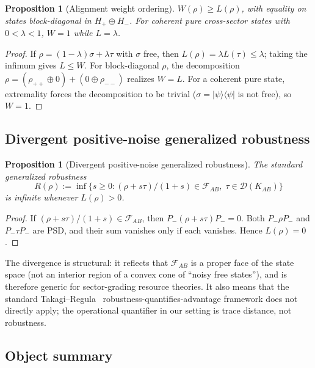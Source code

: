\documentclass[a4paper,onecolumn,noarxiv]{quantumarticle}
\theoremstyle{plain}
\newtheorem{proposition}[theorem]{Proposition}
\theoremstyle{definition}
\theoremstyle{remark}
\newcommand{\KAB}{K_{AB}}
\newcommand{\Pminus}{P_{-}}
\newcommand{\Hplus}{H_{+}}
\newcommand{\Hminus}{H_{-}}
\newcommand{\FAB}{\mathcal{F}_{AB}}
\newcommand{\Lleak}{L}
\begin{document}
\begin{proposition}[Alignment weight ordering]
\label{prop:weight}
$W(\rho)\ge\Lleak(\rho)$, with equality on states block-diagonal in $\Hplus\oplus\Hminus$.
For coherent pure cross-sector states with $0<\lambda<1$, $W=1$ while
$\Lleak=\lambda$.
\end{proposition}

\begin{proof}
If $\rho=(1-\lambda)\sigma+\lambda\tau$ with $\sigma$ free, then
$\Lleak(\rho)=\lambda\Lleak(\tau)\le\lambda$; taking the infimum gives $\Lleak\le W$.
For block-diagonal $\rho$, the decomposition $\rho=(\rho_{++}\oplus 0)+(0\oplus\rho_{--})$
realizes $W=\Lleak$. For a coherent pure state, extremality forces the decomposition
to be trivial ($\sigma=|\psi\rangle\langle\psi|$ is not free), so $W=1$.
\end{proof}

\subsection{Divergent positive-noise generalized robustness}

\begin{proposition}[Divergent positive-noise generalized robustness]
\label{prop:robustness}
The standard generalized robustness
\begin{equation}
  R(\rho) := \inf\{s\ge 0 : (\rho+s\tau)/(1+s)\in\FAB,\;\tau\in\mathcal{D}(\KAB)\}
\end{equation}
is infinite whenever $\Lleak(\rho)>0$.
\end{proposition}

\begin{proof}
If $(\rho+s\tau)/(1+s)\in\FAB$, then $\Pminus(\rho+s\tau)\Pminus=0$. Both
$\Pminus\rho\Pminus$ and $\Pminus\tau\Pminus$ are PSD, and their sum vanishes only if
each vanishes. Hence $\Lleak(\rho)=0$.
\end{proof}

The divergence is structural: it reflects that $\FAB$ is a proper face of the state
space (not an interior region of a convex cone of ``noisy free states''), and is
therefore generic for sector-grading resource theories. It also means that the
standard Takagi--Regula~\cite{TakagiRegula2019} robustness-quantifies-advantage
framework does not directly apply; the operational quantifier in our setting is trace
distance, not robustness.

\subsection{Object summary}
\label{sec:object-summary}
\end{document}
